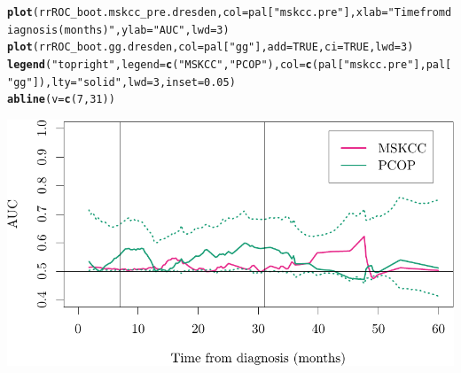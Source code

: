 \documentclass{article}\usepackage[]{graphicx}\usepackage[]{color}
\makeatletter
\def\maxwidth{ %
  \ifdim\Gin@nat@width>\linewidth
    \linewidth
  \else
    \Gin@nat@width
  \fi
}
\newcommand{\hlnum}[1]{\textcolor[rgb]{0.686,0.059,0.569}{#1}}%
\newcommand{\hlstr}[1]{\textcolor[rgb]{0.192,0.494,0.8}{#1}}%
\newcommand{\hlstd}[1]{\textcolor[rgb]{0.345,0.345,0.345}{#1}}%
\newcommand{\hlkwc}[1]{\textcolor[rgb]{0.333,0.667,0.333}{#1}}%
\newcommand{\hlkwd}[1]{\textcolor[rgb]{0.737,0.353,0.396}{\textbf{#1}}}%
\newenvironment{kframe}{%
 \def\at@end@of@kframe{}%
 \ifinner\ifhmode%
  \def\at@end@of@kframe{\end{minipage}}%
  \begin{minipage}{\columnwidth}%
 \fi\fi%
 \def\FrameCommand##1{\hskip\@totalleftmargin \hskip-\fboxsep
 \colorbox{shadecolor}{##1}\hskip-\fboxsep
     \hskip-\linewidth \hskip-\@totalleftmargin \hskip\columnwidth}%
 \MakeFramed {\advance\hsize-\width
   \@totalleftmargin\z@ \linewidth\hsize
   \@setminipage}}%
 {\par\unskip\endMakeFramed%
 \at@end@of@kframe}
\newenvironment{knitrout}{}{} %
\makeatother
\begin{document}
\begin{knitrout}
\color{fgcolor}\begin{kframe}
\begin{alltt}
\hlkwd{plot}\hlstd{(rrROC_boot.mskcc_pre.dresden,} \hlkwc{col} \hlstd{= pal[}\hlstr{"mskcc.pre"}\hlstd{],} \hlkwc{xlab} \hlstd{=} \hlstr{"Time from diagnosis (months)"}\hlstd{,} \hlkwc{ylab} \hlstd{=} \hlstr{"AUC"}\hlstd{,} \hlkwc{lwd} \hlstd{=} \hlnum{3}\hlstd{)}
\hlkwd{plot}\hlstd{(rrROC_boot.gg.dresden,} \hlkwc{col} \hlstd{= pal[}\hlstr{"gg"}\hlstd{],} \hlkwc{add} \hlstd{=} \hlnum{TRUE}\hlstd{,} \hlkwc{ci} \hlstd{=} \hlnum{TRUE}\hlstd{,} \hlkwc{lwd} \hlstd{=} \hlnum{3}\hlstd{)}
\hlkwd{legend}\hlstd{(}\hlstr{"topright"}\hlstd{,} \hlkwc{legend} \hlstd{=} \hlkwd{c}\hlstd{(}\hlstr{"MSKCC"}\hlstd{,} \hlstr{"PCOP"}\hlstd{),} \hlkwc{col} \hlstd{=} \hlkwd{c}\hlstd{(pal[}\hlstr{"mskcc.pre"}\hlstd{], pal[}\hlstr{"gg"}\hlstd{]),} \hlkwc{lty} \hlstd{=} \hlstr{"solid"}\hlstd{,} \hlkwc{lwd} \hlstd{=} \hlnum{3}\hlstd{,} \hlkwc{inset} \hlstd{=} \hlnum{0.05}\hlstd{)}
\hlkwd{abline}\hlstd{(}\hlkwc{v} \hlstd{=} \hlkwd{c}\hlstd{(}\hlnum{7}\hlstd{,} \hlnum{31}\hlstd{))}
\end{alltt}
\end{kframe}

{\centering \includegraphics[width=\maxwidth]{figure/07-risksetROC-plot-dresden-1} 

}



\end{knitrout}
\end{document}
